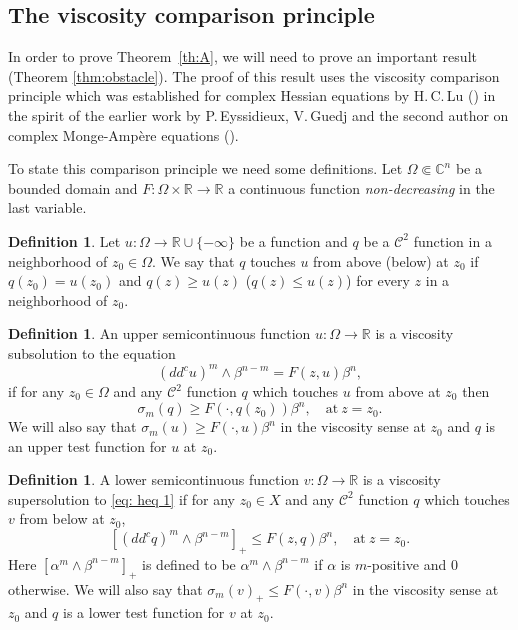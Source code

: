 \documentclass[JEP,XML,SOM,Unicode]{cedram}
\theoremstyle{definition}
\newtheorem{definition}[theorem]{Definition}
\newcommand{\R}{\mathbb{R}}
\renewcommand{\C}{\mathbb{C}}
\newcommand{\Cc}{\mathcal{C}}
\begin{document}
\subsection{The viscosity comparison principle}

In order to prove Theorem~\ref{th:A}, we will need to prove an important result (Theorem \ref{thm:obstacle}). The proof of this result uses the viscosity comparison principle which was established for complex Hessian equations by H.\,C.\,Lu (\cite{Lu13}) in the spirit of the earlier work by P.\,Eyssidieux, V.\,Guedj and the second author on complex Monge-Ampère equations (\cite{EGZ11}).

To state this comparison principle we need some definitions. Let $\Omega \Subset \C^n$ be a bounded domain and $F: \Omega \times \R \to \R$ a continuous function \emph{non-decreasing} in the last variable.
\begin{definition}
Let $u: \Omega\to \R\cup\{-\infty\}$ be a function and $q$ be a $\Cc^2$ function in a neighborhood of $z_0\in \Omega$. We say that $q$ touches $u$ from above (\resp below) at $z_0$ if $q(z_0)=u(z_0)$ and $q(z)\geq u(z)$ (\resp $q(z)\leq u(z)$) for every $z$ in a neighborhood of $z_0$.
\end{definition}

\begin{definition}\label{def: viscosity subsolution}
An upper semicontinuous function $u: \Omega\to \R$ is a viscosity subsolution to the equation
\begin{equation}\label{eq: heq 1}
(dd^c u)^m\wedge \beta^{n-m} = F(z,u)\beta^n,
\end{equation}
if for any $z_0\in \Omega$ and any $\Cc^2$ function $q$ which touches $u$ from above at $z_0$ then
\[
\sigma_m(q) \geq F(\cdot,q (z_0))\beta^n, \quad \text{at} \ z = z_0.
\]
We will also say that $\sigma_m(u)\geq F(\cdot,u)\beta^n$ in the viscosity sense at $z_0$ and $q$ is an upper test function for $u$ at $z_0$.
\end{definition}
\begin{definition}\label{def: viscosity supersolution}
A lower semicontinuous function $v: \Omega \to \R$ is a viscosity supersolution to \eqref{eq: heq 1} if for any $z_0\in X$ and any $\Cc^2$ function $q$ which touches $v$ from below at $z_0$,
\[
[(dd^c q)^m\wedge \beta^{n-m}]_+\leq F(z,q)\beta^n, \quad \text{at} \ z = z_0.
\]
Here $[\alpha^m\wedge\beta^{n-m}]_+$ is defined to be $\alpha^m\wedge\beta^{n-m} $ if $\alpha$ is $m$-positive and $0$ otherwise. We will also say that $\sigma_m(v)_+ \leq F(\cdot,v)\beta^n$ in the viscosity sense at $z_0$ and $q$ is a lower test function for $v$ at $z_0$.
\end{definition}
\end{document}
